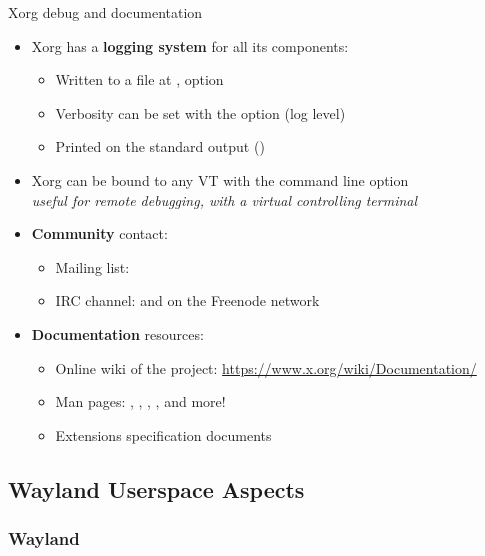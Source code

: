 \begin{frame}[fragile]{Xorg debug and documentation}
  \begin{itemize}
  \item Xorg has a \textbf{logging system} for all its components:
    \begin{itemize}
    \item Written to a file at ,  option
    \item Verbosity can be set with the  option (log level)
    \item Printed on the standard output ()
    \end{itemize}
  \item Xorg can be bound to any VT with the  command line option\\
    \textit{useful for remote debugging, with a virtual controlling terminal}
  \item \textbf{Community} contact:
    \begin{itemize}
    \item Mailing list: 
    \item IRC channel:  and  on the Freenode network
    \end{itemize}
  \item \textbf{Documentation} resources:
    \begin{itemize}
    \item Online wiki of the project: \url{https://www.x.org/wiki/Documentation/}
    \item Man pages: , , , ,  and more!
    \item Extensions specification documents
    \end{itemize}
  \end{itemize}
\end{frame}

\subsection{Wayland Userspace Aspects}

\subsubsection{Wayland}

